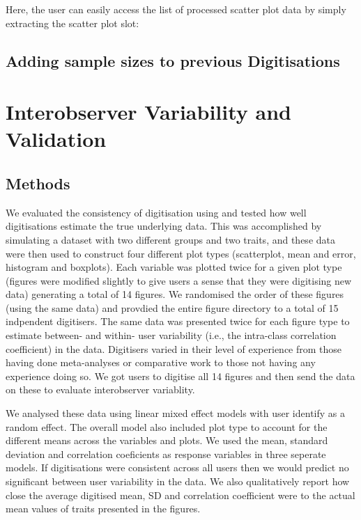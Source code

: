 \documentclass[article]{jss}
\begin{document}
Here, the user can easily access the list of processed scatter plot data by simply extracting the scatter plot slot:

\begin{CodeChunk}
\end{CodeChunk}

\subsection{Adding sample sizes to previous Digitisations}

\section{Interobserver Variability and Validation}
\subsection{Methods}
We evaluated the consistency of digitisation using  and tested how well digitisations estimate the true underlying data. This was accomplished by simulating a dataset with two different groups and two traits, and these data were then used to construct four different plot types (scatterplot, mean and error, histogram and boxplots). Each variable was plotted twice for a given plot type (figures were modified slightly to give users a sense that they were digitising new data) generating a total of 14 figures. We randomised the order of these figures (using the same data) and provdied the entire figure directory to a total of 15 indpendent digitisers. The same data was presented twice for each figure type to estimate between- and within- user variability (i.e., the intra-class correlation coefficient) in the data. Digitisers varied in their level of experience from those having done meta-analyses or comparative work to those not having any experience doing so. We got users to digitise all 14 figures and then send the data on these to evaluate interobserver variablity. 

We analysed these data using linear mixed effect models with user identify as a random effect. The overall model also included plot type to account for the different means across the variables and plots. We used the mean, standard deviation and correlation coeficients as response variables in three seperate models. If digitisations were consistent across all users then we would predict no significant between user variability in the data. We also qualitatively report how close the average digitised mean, SD and correlation coefficient were to the actual mean values of traits presented in the figures. 
\end{document}
